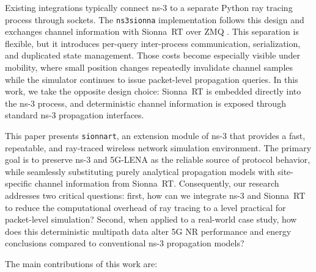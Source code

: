 Existing integrations typically connect ns-3 to a separate Python ray tracing process through sockets.
The \texttt{ns3sionna} implementation follows this design and exchanges channel information with Sionna~RT over ZMQ \cite{ns3sionna}.
This separation is flexible, but it introduces per-query inter-process communication, serialization, and duplicated state management.
Those costs become especially visible under mobility, where small position changes repeatedly invalidate channel samples while the simulator continues to issue packet-level propagation queries.
In this work, we take the opposite design choice: Sionna~RT is embedded directly into the ns-3 process, and deterministic channel information is exposed through standard ns-3 propagation interfaces.

This paper presents \texttt{sionnart}, an extension module of ns-3 that provides a fast, repeatable, and ray-traced wireless network simulation environment.
The primary goal is to preserve ns-3 and 5G-LENA as the reliable source of protocol behavior, while seamlessly substituting purely analytical propagation models with site-specific channel information from Sionna~RT.
Consequently, our research addresses two critical questions: first, how can we integrate ns-3 and Sionna~RT to reduce the computational overhead of ray tracing to a level practical for packet-level simulation? Second, when applied to a real-world case study, how does this deterministic multipath data alter 5G NR performance and energy conclusions compared to conventional ns-3 propagation models?

The main contributions of this work are:

